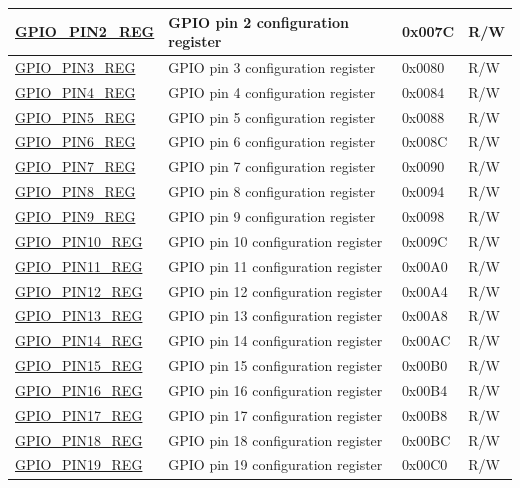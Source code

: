 \begin{longtable}{ | p{6cm} | p{7.2cm} | p{1.3cm} | p{1cm} | }
\hyperref[regdesc:GPIOPINNREG]{GPIO\_PIN2\_REG} & GPIO pin 2 configuration register & 0x007C & R/W \\ \hline
\hyperref[regdesc:GPIOPINNREG]{GPIO\_PIN3\_REG} & GPIO pin 3 configuration register & 0x0080 & R/W \\ \hline
\hyperref[regdesc:GPIOPINNREG]{GPIO\_PIN4\_REG} & GPIO pin 4 configuration register & 0x0084 & R/W \\ \hline
\hyperref[regdesc:GPIOPINNREG]{GPIO\_PIN5\_REG} & GPIO pin 5 configuration register & 0x0088 & R/W \\ \hline
\hyperref[regdesc:GPIOPINNREG]{GPIO\_PIN6\_REG} & GPIO pin 6 configuration register & 0x008C & R/W \\ \hline
\hyperref[regdesc:GPIOPINNREG]{GPIO\_PIN7\_REG} & GPIO pin 7 configuration register & 0x0090 & R/W \\ \hline
\hyperref[regdesc:GPIOPINNREG]{GPIO\_PIN8\_REG} & GPIO pin 8 configuration register & 0x0094 & R/W \\ \hline
\hyperref[regdesc:GPIOPINNREG]{GPIO\_PIN9\_REG} & GPIO pin 9 configuration register & 0x0098 & R/W \\ \hline
\hyperref[regdesc:GPIOPINNREG]{GPIO\_PIN10\_REG} & GPIO pin 10 configuration register & 0x009C & R/W \\ \hline
\hyperref[regdesc:GPIOPINNREG]{GPIO\_PIN11\_REG} & GPIO pin 11 configuration register & 0x00A0 & R/W \\ \hline
\hyperref[regdesc:GPIOPINNREG]{GPIO\_PIN12\_REG} & GPIO pin 12 configuration register & 0x00A4 & R/W \\ \hline
\hyperref[regdesc:GPIOPINNREG]{GPIO\_PIN13\_REG} & GPIO pin 13 configuration register & 0x00A8 & R/W \\ \hline
\hyperref[regdesc:GPIOPINNREG]{GPIO\_PIN14\_REG} & GPIO pin 14 configuration register & 0x00AC & R/W \\ \hline
\hyperref[regdesc:GPIOPINNREG]{GPIO\_PIN15\_REG} & GPIO pin 15 configuration register & 0x00B0 & R/W \\ \hline
\hyperref[regdesc:GPIOPINNREG]{GPIO\_PIN16\_REG} & GPIO pin 16 configuration register & 0x00B4 & R/W \\ \hline
\hyperref[regdesc:GPIOPINNREG]{GPIO\_PIN17\_REG} & GPIO pin 17 configuration register & 0x00B8 & R/W \\ \hline
\hyperref[regdesc:GPIOPINNREG]{GPIO\_PIN18\_REG} & GPIO pin 18 configuration register & 0x00BC & R/W \\ \hline
\hyperref[regdesc:GPIOPINNREG]{GPIO\_PIN19\_REG} & GPIO pin 19 configuration register & 0x00C0 & R/W \\ \hline

\end{longtable}
